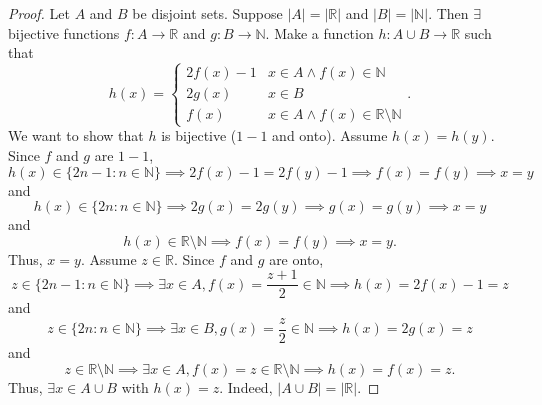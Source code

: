 \documentclass{amsart}
\theoremstyle{definition}
\begin{document}
\begin{proof}
    Let $A$ and $B$ be disjoint sets. Suppose $\vert A \vert = \vert \mathbb{R} \vert$ and $\vert B \vert = \vert \mathbb{N} \vert$. Then $\exists$ bijective functions $f: A \to \mathbb{R}$ and $g: B \to \mathbb{N}$. Make a function $h: A \cup B \to \mathbb{R}$ such that
    \[
    h(x) = \begin{cases} 
      2f(x) - 1 & x \in A \land f(x) \in \mathbb{N} \\
      2g(x) & x \in B \\
      f(x) & x \in A \land f(x) \in \mathbb{R} \setminus \mathbb{N}
    \end{cases}.
    \]
    We want to show that $h$ is bijective ($1-1$ and onto). Assume $h(x) = h(y)$. Since $f$ and $g$ are $1-1$, 
    \[
    h(x) \in \{2n - 1 : n \in \mathbb{N}\} \implies 2f(x) - 1 = 2f(y) - 1 \implies f(x) = f(y) \implies x = y
    \]
    and 
    \[
    h(x) \in \{2n : n \in \mathbb{N}\} \implies 2g(x) = 2g(y) \implies g(x) = g(y) \implies x = y
    \]
    and 
    \[
    h(x) \in \mathbb{R} \setminus \mathbb{N} \implies f(x) = f(y) \implies x = y.
    \]
    Thus, $x = y$. Assume $z \in \mathbb{R}$. Since $f$ and $g$ are onto, 
    \[
    z \in \{2n - 1 : n \in \mathbb{N}\} \implies \exists x \in A, f(x) = \frac{z + 1}{2} \in \mathbb{N} \implies h(x) = 2f(x) - 1 = z
    \]
    and 
    \[
    z \in \{2n : n \in \mathbb{N}\} \implies \exists x \in B, g(x) = \frac{z}{2} \in \mathbb{N} \implies h(x) = 2g(x) = z
    \]
    and 
    \[
    z \in \mathbb{R} \setminus \mathbb{N} \implies \exists x \in A, f(x) = z \in \mathbb{R} \setminus \mathbb{N} \implies h(x) = f(x) = z.
    \]
    Thus, $\exists x \in A \cup B$ with $h(x) = z$. Indeed, $\vert A \cup B \vert = \vert \mathbb{R} \vert$.
\end{proof}
\end{document}
